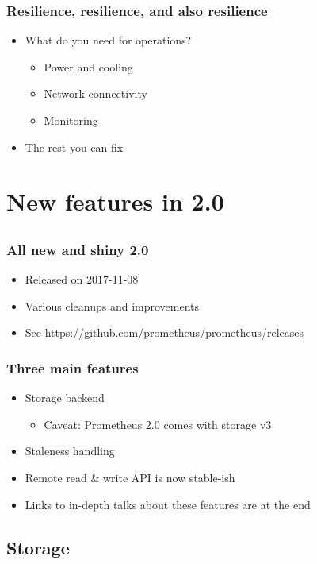 \documentclass[t]{beamer}
\begin{document}
\begin{frame}
	\frametitle{Resilience, resilience, and also resilience}
	\begin{itemize}
		\item What do you need for operations?
		\begin{itemize}
			\item Power and cooling
			\item Network connectivity
			\item Monitoring
		\end{itemize}
		\item The rest you can fix
	\end{itemize}
\end{frame}


\section{New features in 2.0}
\subsection{}

\begin{frame}
	\frametitle{All new and shiny 2.0}
	\begin{itemize}
		\item Released on 2017-11-08
		\item Various cleanups and improvements
		\item See \url{https://github.com/prometheus/prometheus/releases}
	\end{itemize}
\end{frame}

\begin{frame}
	\frametitle{Three main features}
	\begin{itemize}
		\item Storage backend
		\begin{itemize}
			\item Caveat: Prometheus 2.0 comes with storage v3
		\end{itemize}
		\item Staleness handling
		\item Remote read \& write API is now stable-ish
		\item Links to in-depth talks about these features are at the end
	\end{itemize}
\end{frame}


\subsection{Storage}
\end{document}
